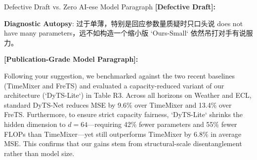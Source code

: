 \begin{ExampleBox}{Defective Draft vs. Zero AI-ese Model Paragraph}
\textbf{\color{TargetHighlight}[Defective Draft]:}\par
{}\par\vspace{4pt}
\textbf{Diagnostic Autopsy}: 过于单薄，特别是回应参数量质疑时只口头说 does not have many parameters，远不如构造一个缩小版 `Ours-Small` 依然吊打对手有说服力。\par\vspace{6pt}
\textbf{\color{AcadNavy}[Publication-Grade Model Paragraph]:}\par
Following your suggestion, we benchmarked against the two recent baselines (TimeMixer and FreTS) and evaluated a capacity-reduced variant of our architecture (`DyTS-Lite`) in Table R3. Across all horizons on Weather and ECL, standard DyTS-Net reduces MSE by 9.6\% over TimeMixer and 13.4\% over FreTS. Furthermore, to ensure strict capacity fairness, `DyTS-Lite` shrinks the hidden dimension to $d=64$---requiring 42\% fewer parameters and 55\% fewer FLOPs than TimeMixer---yet still outperforms TimeMixer by 6.8\% in average MSE. This confirms that our gains stem from structural-scale disentanglement rather than model size.
\end{ExampleBox}
